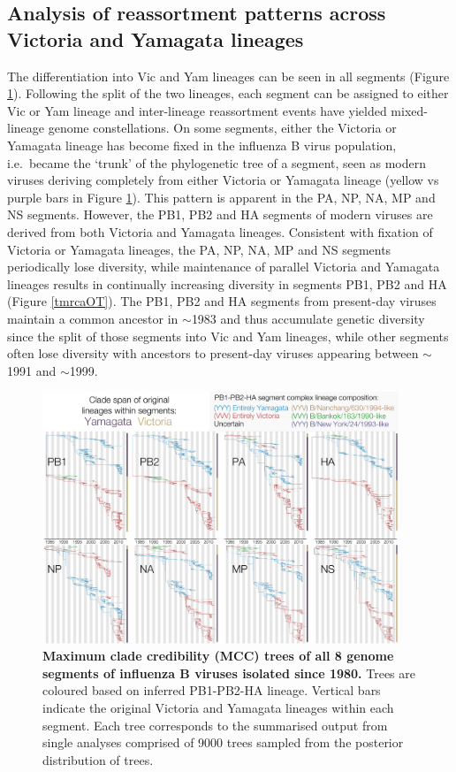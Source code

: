 \documentclass[11pt,oneside,letterpaper]{article}
\begin{document}
\subsection*{Analysis of reassortment patterns across Victoria and Yamagata lineages}
The differentiation into Vic and Yam lineages can be seen in all segments (Figure \ref{genomeGrid}).
Following the split of the two lineages, each segment can be assigned to either Vic or Yam lineage and inter-lineage reassortment events have yielded mixed-lineage genome constellations.
On some segments, either the Victoria or Yamagata lineage has become fixed in the influenza B virus population, i.e.\ became the `trunk' of the phylogenetic tree of a segment, seen as modern viruses deriving completely from either Victoria or Yamagata lineage (yellow vs purple bars in Figure \ref{genomeGrid}).
This pattern is apparent in the PA, NP, NA, MP and NS segments.
However, the PB1, PB2 and HA segments of modern viruses are derived from both Victoria and Yamagata lineages.
Consistent with fixation of Victoria or Yamagata lineages, the PA, NP, NA, MP and NS segments periodically lose diversity, while maintenance of parallel Victoria and Yamagata lineages results in continually increasing diversity in segments PB1, PB2 and HA (Figure \ref{tmrcaOT}).
The PB1, PB2 and HA segments from present-day viruses maintain a common ancestor in $\sim$1983 and thus accumulate genetic diversity since the split of those segments into Vic and Yam lineages, while other segments often lose diversity with ancestors to present-day viruses appearing between $\sim$1991 and $\sim$1999.

\begin{figure}[h]
\centering
\includegraphics[width=0.95\textwidth]{supp_figures/InfB_genomeGrid.pdf}
\caption{\textbf{Maximum clade credibility (MCC) trees of all 8 genome segments of influenza B viruses isolated since 1980.}
Trees are coloured based on inferred PB1-PB2-HA lineage.
Vertical bars indicate the original Victoria and Yamagata lineages within each segment.
Each tree corresponds to the summarised output from single analyses comprised of 9000 trees sampled from the posterior distribution of trees.
}
\label{genomeGrid}
\end{figure}
\end{document}
